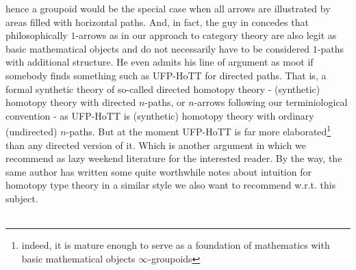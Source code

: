 hence a groupoid would be the special case when all arrows are illustrated by areas filled with horizontal paths. And, in fact, the guy in \cite{e5194763} concedes that philosophically $1$-arrows as in our approach to category theory are also legit as basic mathematical objects and do not necessarily have to be considered $1$-paths with additional structure. He even admits his line of argument as {\glqq}moot{\grqq} if somebody finds something such as UFP-HoTT for directed paths. That is, a formal synthetic theory of so-called {\glqq}directed homotopy theory{\grqq} - (synthetic) homotopy theory with directed $n$-paths, or $n$-arrows following our terminiological convention - as UFP-HoTT is (synthetic) homotopy theory with ordinary (undirected) $n$-paths. But at the moment UFP-HoTT is far more elaborated\footnote{indeed, it is mature enough to serve as a foundation of mathematics with basic mathematical objects $\infty$-groupoids} than any directed version of it. Which is another argument in \cite{e5194763} which we recommend as lazy weekend literature for the interested reader. By the way, the same author has written some quite worthwhile notes \cite{2d5c2e63} about intuition for homotopy type theory in a similar style we also want to recommend w.r.t. this subject.
\\\\
